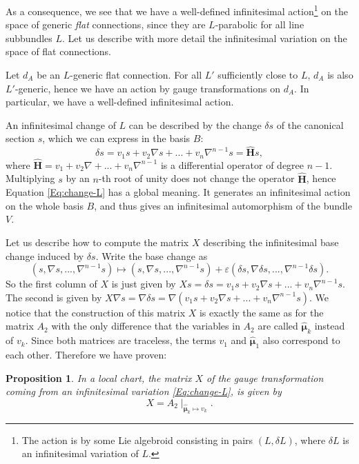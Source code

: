 \documentclass[11pt]{amsart}
\newtheorem{prop}[thm]{Proposition}
\numberwithin{thm}{section} %
\numberwithin{equation}{section} %
\numberwithin{figure}{section} %
\begin{document}
As a consequence, we see that we have a well-defined infinitesimal action\footnote{The action is by some Lie algebroid consisting in pairs $(L,\delta L)$, where $\delta L$ is an infinitesimal variation of $L$.} on the space of generic \emph{flat} connections, since they are $L$-parabolic for all line subbundles $L$. Let us describe with more detail the infinitesimal variation on the space of flat connections.

\medskip
Let $d_A$ be an $L$-generic flat connection. For all $L'$ sufficiently close to $L$, $d_A$ is also $L'$-generic, hence we have an action by gauge transformations on $d_A$. In particular, we have a well-defined infinitesimal action.

An infinitesimal change of $L$ can be described by the change $\delta s$ of the canonical section $s$, which we can express in the basis $B$:
\begin{equation}\label{Eq:change-L}
\delta s = v_1 s+v_2\nabla s +...+v_{n}\nabla^{n-1}s = \bm\hat{H}s,
\end{equation}
where $\bm\hat{H}=v_1+v_2\nabla+...+v_{n}\nabla^{n-1}$ is a differential operator of degree $n-1$. Multiplying $s$ by an $n$-th root of unity does not change the operator $\bm\hat{H}$, hence Equation \eqref{Eq:change-L} has a global meaning. It generates an infinitesimal action on the whole basis $B$, and thus gives an infinitesimal automorphism of the bundle $V$.

Let us describe how to compute the matrix $X$ describing the infinitesimal base change induced by $\delta s$. 
Write the base change as $$(s,\nabla s,...,\nabla^{n-1}s) \mapsto (s,\nabla s,...,\nabla^{n-1}s)+\varepsilon (\delta s,\nabla \delta s,...,\nabla^{n-1}\delta s).$$ So the first column of $X$ is just given by $Xs = \delta s = v_1s+v_2\nabla s+...+v_n\nabla^{n-1}s$. The second is given by $X\nabla s = \nabla \delta s = \nabla(v_1s+v_2\nabla s+...+v_n\nabla^{n-1}s)$. 
We notice that the construction of this matrix $X$ is exactly the same as for the matrix $A_2$ with the only difference that the variables in $A_2$ are called $\bm\hat{\mu}_k$ instead of $v_k$. Since both matrices are traceless, the terms $v_1$ and $\bm\hat\mu_1$ also correspond to each other. Therefore we have proven: 
\begin{prop}\label{computeX}
In a local chart, the matrix $X$ of the gauge transformation coming from an infinitesimal variation \eqref{Eq:change-L}, is given by $$X=A_2 \mid_{\bm\hat{\mu}_k\mapsto v_k}.$$
\end{prop}
\end{document}
